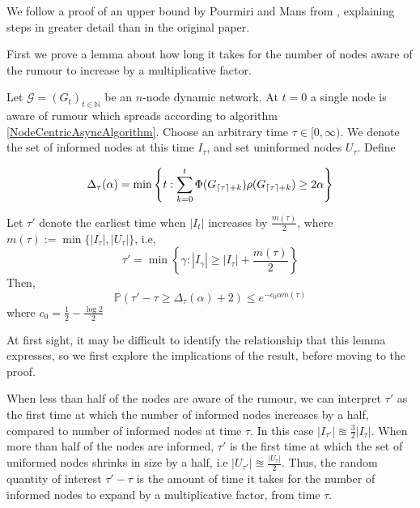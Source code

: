 We follow a proof of an upper bound by Pourmiri and Mans from \cite{asyncPaper}, explaining steps in greater detail than in the original paper.

First we prove a lemma about how long it takes for the number of nodes aware of the rumour to increase by a multiplicative factor. 

\begin{lemma} \label{AsyncIncreaseLemma}
	Let $\mathcal{G}=(G_t)_{t \in \mathbb{N}}$ be an $n$-node dynamic network. At $t=0$ a single node is aware of rumour which spreads according to algorithm \ref{NodeCentricAsyncAlgorithm}. Choose an arbitrary time $\tau \in [0, \infty)$. We denote the set of informed nodes at this time $I_\tau$, and set uninformed nodes $U_\tau$.
	\noindent
	Define 
	
	$$
	\Delta_\tau(\alpha) = \min \left\{t: \sum_{k=0}^t \Phi(G_{\ceil*{\tau}+k})\rho(G_{\ceil*{\tau}+k}) \geq 2 \alpha \right\}
	$$

	\noindent
	Let $\tau'$ denote the earliest time when $|I_t|$ increases by $\frac{m(\tau)}{2}$, where $m(\tau) := \min\{|I_\tau|, |U_\tau|\}$, i.e,
	$$
		\tau' = \min\left\{\gamma : |I_{\gamma}| \geq |I_\tau| + \frac{m(\tau)}{2}\right\}
	$$
	\noindent
	Then, 
	$$
		\mathbb{P}(\tau' - \tau \geq \Delta_\tau(\alpha) + 2) \leq e^{-c_0\alpha m(\tau)}
	$$
	\noindent
	where $c_0 = \frac{1}{2} - \frac{\log 2}{2}$
\end{lemma}

At first sight, it may be difficult to identify the relationship that this lemma expresses, so we first explore the implications of the result, before moving to the proof.

When less than half of the nodes are aware of the rumour, we can interpret $\tau'$ as the first time at which the number of informed nodes increases by a half, compared to number of informed nodes at time $\tau$. In this case $|I_{\tau'}| \approxeq \frac{3}{2} |I_\tau|$. When more than half of the nodes are informed, $\tau'$ is the first time at which the set of uniformed nodes shrinks in size by a half, i.e $|U_{\tau'}| \approxeq \frac{|U_\tau|}{2}$. Thus, the random quantity of interest $\tau'-\tau$ is the amount of time it takes for the number of informed nodes to expand by a multiplicative factor, from time $\tau$. 

